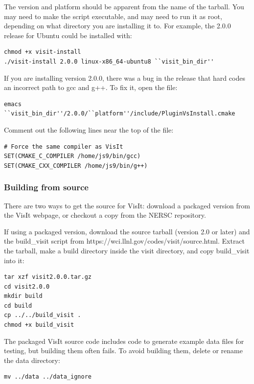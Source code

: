 \documentclass[12pt]{article}
\begin{document}
The version and platform should be apparent from the name of the tarball.  
You may need to make the script executable, and may need to run it as root, depending
on what directory you are installing it to.  For example, the 2.0.0 release for 
Ubuntu could be installed with:
\begin{verbatim}
chmod +x visit-install
./visit-install 2.0.0 linux-x86_64-ubuntu8 ``visit_bin_dir''
\end{verbatim}

If you are installing version 2.0.0, there was a bug in the release that
hard codes an incorrect path to gcc and g++.  To fix it, open the file:
\begin{verbatim}
emacs ``visit_bin_dir''/2.0.0/``platform''/include/PluginVsInstall.cmake
\end{verbatim}

Comment out the following lines near the top of the file:
\begin{verbatim}
# Force the same compiler as VisIt
SET(CMAKE_C_COMPILER /home/js9/bin/gcc)
SET(CMAKE_CXX_COMPILER /home/js9/bin/g++)
\end{verbatim}


\subsubsection{Building from source}
\label{subsec:VisItVersion2_Build}

There are two ways to get the source for VisIt: download a packaged version from
the VisIt webpage, or checkout a copy from the NERSC repository.

If using a packaged version, download the source tarball (version 2.0
or later) and the build\_visit script from
https://wci.llnl.gov/codes/visit/source.html.  Extract the tarball,
make a build directory inside the visit directory, and copy
build\_visit into it:

\begin{verbatim}
tar xzf visit2.0.0.tar.gz
cd visit2.0.0
mkdir build
cd build
cp ../../build_visit .
chmod +x build_visit
\end{verbatim}

The packaged VisIt source code includes code to generate example data
files for testing, but building them often fails.  To avoid building them,
delete or rename the data directory:

\begin{verbatim}
mv ../data ../data_ignore
\end{verbatim}
\end{document}
